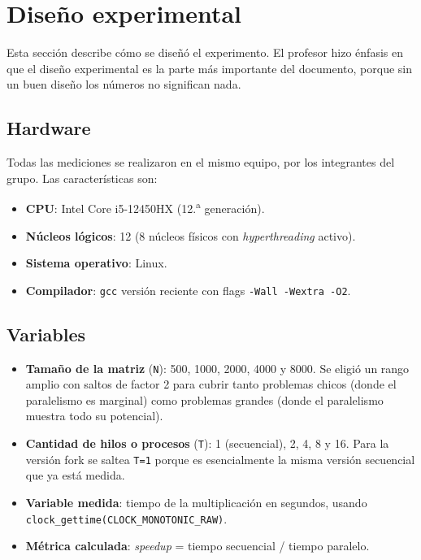 \section{Diseño experimental}

Esta sección describe cómo se diseñó el experimento. El profesor hizo énfasis en que el diseño experimental es la parte más importante del documento, porque sin un buen diseño los números no significan nada.

\subsection{Hardware}

Todas las mediciones se realizaron en el mismo equipo, por los integrantes del grupo. Las características son:

\begin{itemize}
    \item \textbf{CPU}: Intel Core i5-12450HX (12.\textsuperscript{a} generación).
    \item \textbf{Núcleos lógicos}: 12 (8 núcleos físicos con \textit{hyperthreading} activo).
    \item \textbf{Sistema operativo}: Linux.
    \item \textbf{Compilador}: \texttt{gcc} versión reciente con flags \texttt{-Wall -Wextra -O2}.
\end{itemize}

\subsection{Variables}

\begin{itemize}
    \item \textbf{Tamaño de la matriz} (\texttt{N}): 500, 1000, 2000, 4000 y 8000. Se eligió un rango amplio con saltos de factor 2 para cubrir tanto problemas chicos (donde el paralelismo es marginal) como problemas grandes (donde el paralelismo muestra todo su potencial).
    \item \textbf{Cantidad de hilos o procesos} (\texttt{T}): 1 (secuencial), 2, 4, 8 y 16. Para la versión fork se saltea \texttt{T=1} porque es esencialmente la misma versión secuencial que ya está medida.
    \item \textbf{Variable medida}: tiempo de la multiplicación en segundos, usando \texttt{clock\_gettime(CLOCK\_MONOTONIC\_RAW)}.
    \item \textbf{Métrica calculada}: \textit{speedup} = tiempo secuencial / tiempo paralelo.
\end{itemize}

